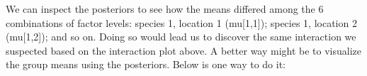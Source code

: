 \documentclass[
  13,
  letterpaper,
]{report}
\newenvironment{Shaded}{\begin{snugshade}}{\end{snugshade}}
\newcommand{\CommentTok}[1]{\textcolor[rgb]{0.37,0.37,0.37}{#1}}
\newcommand{\DecValTok}[1]{\textcolor[rgb]{0.68,0.00,0.00}{#1}}
\newcommand{\FunctionTok}[1]{\textcolor[rgb]{0.28,0.35,0.67}{#1}}
\newcommand{\NormalTok}[1]{\textcolor[rgb]{0.00,0.23,0.31}{#1}}
\newcommand{\OtherTok}[1]{\textcolor[rgb]{0.00,0.23,0.31}{#1}}
\newcommand{\SpecialCharTok}[1]{\textcolor[rgb]{0.37,0.37,0.37}{#1}}
\begin{document}
We can inspect the posteriors to see how the means differed among the 6
combinations of factor levels: species 1, location 1 (mu{[}1,1{]});
species 1, location 2 (mu{[}1,2{]}); and so on. Doing so would lead us
to discover the same interaction we suspected based on the interaction
plot above. A better way might be to visualize the group means using the
posteriors. Below is one way to do it:

\begin{Shaded}
\end{Shaded}
\end{document}
